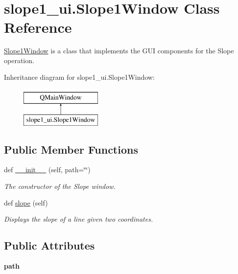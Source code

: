 \hypertarget{classslope1__ui_1_1_slope1_window}{}\section{slope1\+\_\+ui.\+Slope1\+Window Class Reference}
\label{classslope1__ui_1_1_slope1_window}


\hyperlink{classslope1__ui_1_1_slope1_window}{Slope1\+Window} is a class that implements the G\+UI components for the Slope operation.  


Inheritance diagram for slope1\+\_\+ui.\+Slope1\+Window\+:\begin{figure}[H]
\begin{center}
\leavevmode
\includegraphics[height=2.000000cm]{classslope1__ui_1_1_slope1_window}
\end{center}
\end{figure}
\subsection*{Public Member Functions}
\begin{DoxyCompactItemize}
\item 
def \hyperlink{classslope1__ui_1_1_slope1_window_ac6021ae35ba98357f1c982ca6e8349d9}{\+\_\+\+\_\+init\+\_\+\+\_\+} (self, path=\char`\"{}\char`\"{})
\begin{DoxyCompactList}\small\item\em The constructor of the Slope window. \end{DoxyCompactList}\item 
def \hyperlink{classslope1__ui_1_1_slope1_window_a780708482375f4d24622d74f573b1bf6}{slope} (self)
\begin{DoxyCompactList}\small\item\em Displays the slope of a line given two coordinates. \end{DoxyCompactList}\end{DoxyCompactItemize}
\subsection*{Public Attributes}
\begin{DoxyCompactItemize}
\item 
\mbox{\label{classslope1__ui_1_1_slope1_window_aa83675d9cf4871a2ae707a76c3ba5890}} 
{\bfseries path}
\end{DoxyCompactItemize}


